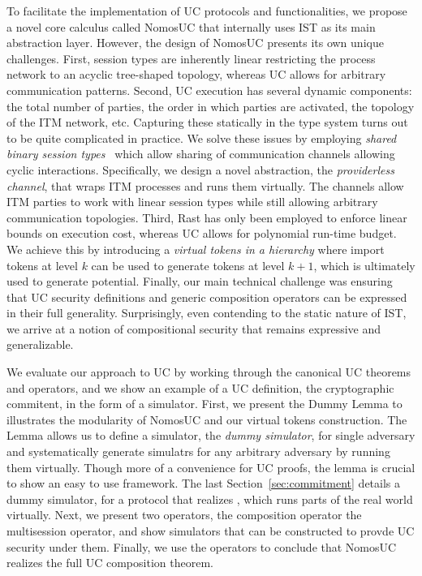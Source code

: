 To facilitate the implementation of UC protocols and functionalities, we propose a novel core calculus called NomosUC that
internally uses IST as its main abstraction layer.
However, the design of NomosUC presents its own unique challenges.
First, session types are inherently linear restricting the process network to an acyclic tree-shaped topology,
whereas UC allows for arbitrary communication patterns.
Second, UC execution has several dynamic components: the total number of parties, the order in which parties are activated,
the topology of the ITM network, etc.
Capturing these statically in the type system turns out to be quite complicated in practice.
We solve these issues by employing \emph{shared binary session types}~\cite{balzer2017manifest} which allow sharing
of communication channels allowing cyclic interactions.
Specifically, we design a novel abstraction, the \emph{providerless channel}, that wraps ITM processes and runs them virtually.
The channels allow ITM parties to work with linear session types while still allowing arbitrary communication topologies.
Third, Rast has only been employed to enforce linear bounds on execution cost, whereas UC allows for polynomial run-time budget.
We achieve this by introducing a \emph{virtual tokens in a hierarchy} where import tokens at level $k$ can be used to generate
tokens at level $k+1$, which is ultimately used to generate potential.
Finally, our main technical challenge was ensuring that UC security definitions and generic composition operators
can be expressed in their full generality.
Surprisingly, even contending to the static nature of IST, we arrive at a notion of compositional security that remains expressive and generalizable.

We evaluate our approach to UC by working through the canonical UC theorems and operators, and we show an example of a UC definition,
the cryptographic commitent, in the form of a simulator. 
First, we present the Dummy Lemma to illustrates the modularity of NomosUC and our virtual tokens construction.
The Lemma allows us to define a simulator, the \emph{dummy simulator}, for single adversary and systematically generate simulatrs for any arbitrary adversary
by running them virtually. Though more of a convenience for UC proofs, the lemma is crucial to show an easy to use framework.
The last Section~\ref{sec:commitment} details a dummy simulator, for a protocol that realizes \Fcom, which runs parts of the real world virtually. 
Next, we present two operators, the composition operator the multisession operator, and show simulators that can be constructed to provde UC security under them.
Finally, we use the operators to conclude that NomosUC realizes the full UC composition theorem.

